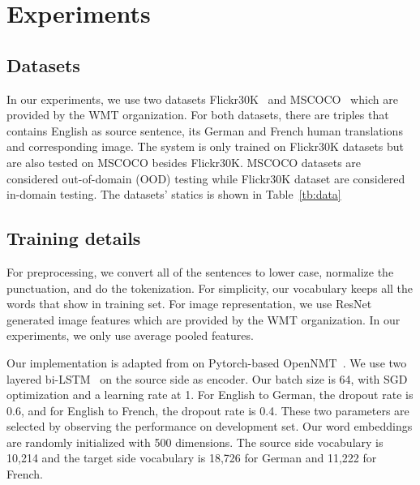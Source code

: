\section{Experiments}
\label{sec:exp}



\subsection{Datasets}

In our experiments, we use two datasets Flickr30K~\cite{elliott:2016} 
and MSCOCO~\cite{MSCOCO} which are provided by the WMT organization.
For both datasets, there are triples that contains English as source 
sentence, its German and French human translations and corresponding 
image. The system is only trained on Flickr30K datasets but are also tested on 
MSCOCO besides Flickr30K. 
MSCOCO datasets are considered out-of-domain (OOD) testing while 
Flickr30K dataset are considered in-domain testing.
The datasets' statics is shown in Table~\ref{tb:data}

\begin{table}[htbp]
\centering
{}
\caption{Summary of datasets statistics.}
\label{tb:data}
\end{table}


\subsection{Training details}

For preprocessing, we convert all of the sentences to lower case, normalize the 
punctuation, and do the tokenization. For simplicity, our vocabulary keeps all the 
words that show in training set. 
For image representation, we use ResNet~\cite{kaiming:2016} generated image features which are
provided by the WMT organization. In our experiments, we only use average pooled features.

Our implementation is adapted from on Pytorch-based OpenNMT~\cite{2017opennmt}. We use two layered
bi-LSTM~\cite{Sutskever:2014} on the source side as encoder. Our batch size is 64, with SGD optimization and a learning rate at 1.
For English to German, the dropout rate 
is 0.6, and for English to French, the dropout rate is 0.4. These two parameters are selected by
observing the performance on development set. Our word embeddings are randomly initialized with 
500 dimensions. 
The source side vocabulary is 10,214 and the target side vocabulary is 18,726 for German 
and 11,222 for French.

